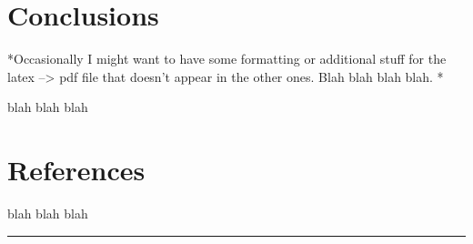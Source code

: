 \documentclass{report}
\begin{document}
    \section{Conclusions}


    *Occasionally I might want to have some formatting or additional stuff
for the latex --\textgreater{} pdf file that doesn't appear in the other
ones. Blah blah blah blah. *

    blah blah blah


    \section{References}


    blah blah blah

    \begin{center}\rule{3in}{0.4pt}\end{center}



    
    
%
%
%
    
    
\end{document}
